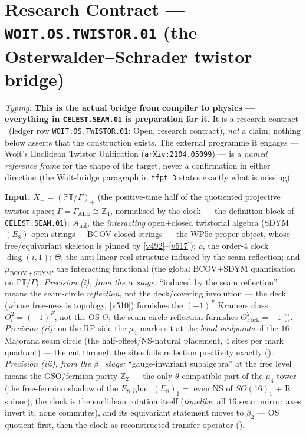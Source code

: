 \documentclass[11pt,a4paper]{article}
\newcommand{\Z}{\mathbb Z}
\begin{document}
\section*{Research Contract --- \texttt{WOIT.OS.TWISTOR.01} (the Osterwalder--Schrader twistor bridge)}
\noindent\emph{Typing.} \textbf{This is the actual bridge from compiler to physics --- everything in
\texttt{CELEST.SEAM.01} is preparation for it.} It is a research contract \mO\ (ledger row
\texttt{WOIT.OS.TWISTOR.01}: Open, research contract), \emph{not} a claim; nothing below asserts
that the construction exists. The external programme it engages --- Woit's Euclidean Twistor
Unification (\texttt{arXiv:2104.05099}) --- is a \emph{named reference frame} for the shape of the
target, never a confirmation in either direction (the Woit-bridge paragraph in \texttt{tfpt\_3}
states exactly what is missing).

\par\smallskip\noindent\textbf{Input.} $X_+=(\mathbb{PT}/\Gamma)_+$ (the positive-time half of the
quotiented projective twistor space; $\Gamma=\Gamma_{\mathrm{ALE}}\cong\Z_4$, normalised by the
clock --- the definition block of \texttt{CELEST.SEAM.01}); $\mathcal A_{\mathrm{hol}}$, the
\emph{interacting} open$+$closed twistorial algebra (SDYM$(E_8)$ open strings $+$ BCOV closed
strings --- the WP5e-proper object, whose free/equivariant skeleton is pinned by
\vref{v492}--\vref{v517}); $\rho$, the order-$4$ clock $\operatorname{diag}(i,1)$; $\Theta$, the
anti-linear real structure induced by the seam reflection; and $\mu_{\mathrm{BCOV+SDYM}}$, the
interacting functional (the global BCOV$+$SDYM quantisation on $\mathbb{PT}/\Gamma$).
\emph{Precision (i), from the $\alpha$ stage:} ``induced by the seam reflection'' means the
seam-circle \emph{reflection}, not the deck/covering involution --- the deck (whose free-ness is
topology, \vref{v510}) furnishes the $(-1)^F$ Kramers class $\Theta_t^2=(-1)^F$, not the OS
$\Theta$; the seam-circle reflection furnishes $\Theta_{\mathrm{Fock}}^2=+1$
().
\emph{Precision (ii):} on the RP side the $\mu_4$ marks sit at the \emph{bond midpoints} of the
$16$-Majorana seam circle (the half-offset/NS-natural placement, $4$ sites per mark quadrant) ---
the cut through the sites fails reflection positivity exactly
().
\emph{Precision (iii), from the $\beta_1$ stage:} ``gauge-invariant subalgebra'' at the free
level means the GSO/fermion-parity $\Z_2$ --- the only $\theta$-compatible part of the $\mu_4$
tower (the free-fermion shadow of the $E_8$ glue: $(E_8)_1=$ even NS of $SO(16)_1$ $+$ R
spinor); the clock is the euclidean rotation itself (\emph{timelike}: all $16$ seam mirror axes
invert it, none commutes), and its equivariant statement moves to $\beta_2$ --- OS quotient
first, then the clock as reconstructed transfer operator
().
\end{document}

